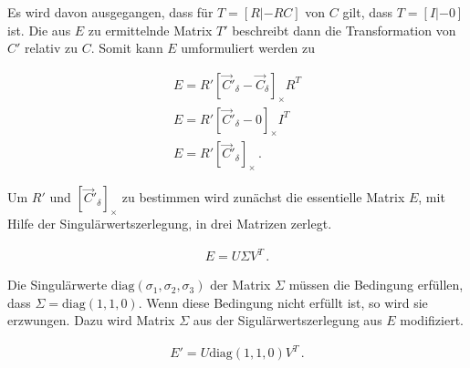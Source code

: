 %


Es wird davon ausgegangen, dass für $T = [R|-RC]$ von $C$ gilt, dass $T = [I|-0]$ ist. Die aus $E$ zu ermittelnde Matrix $T'$ beschreibt dann die Transformation von $C'$ relativ zu $C$\cite{HZ,Ferid}. Somit kann $E$ umformuliert werden zu

\begin{gather}
	E = R'[\overrightarrow{C}'_\delta - \overrightarrow{C}_\delta]_\times R^T\\
	E = R'[\overrightarrow{C}'_\delta - 0]_\times I^T\\
	E = R'[\overrightarrow{C}'_\delta]_\times \, .
\end{gather}


Um $R'$ und $[\overrightarrow{C}'_\delta]_\times$ zu bestimmen wird zunächst die essentielle Matrix \ensuremath{E}, mit Hilfe der Singulärwertszerlegung, in drei Matrizen zerlegt. 

\begin{gather}
E = U\Sigma V^T \, .
\end{gather}


Die Singulärwerte $\text{diag}(\sigma_1,\sigma_2,\sigma_3)$ der Matrix $\Sigma$ müssen die Bedingung erfüllen, dass $\Sigma = \text{diag}(1,1,0)$\cite{HZ,Ferid}. Wenn diese Bedingung nicht erfüllt ist, so wird sie erzwungen. Dazu wird Matrix $\Sigma$ aus der Sigulärwertszerlegung aus $E$ modifiziert\cite{HZ,Ferid}. 

\begin{gather}
	E' = U\text{diag}(1,1,0)V^T \, .
\end{gather}  




